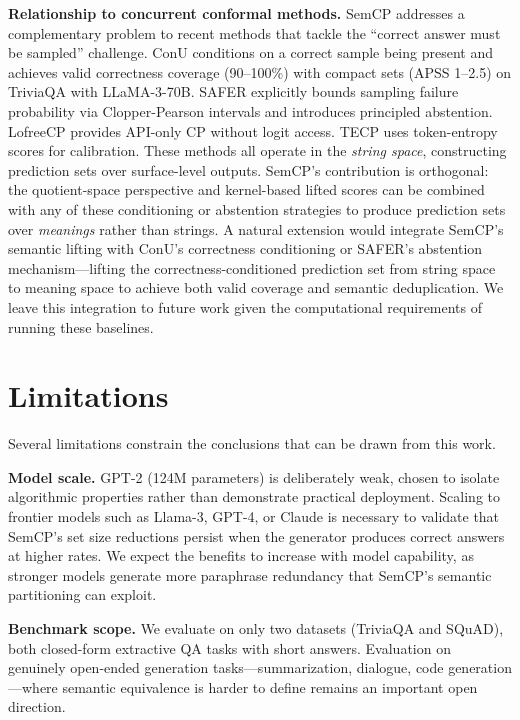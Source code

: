 \documentclass{article}
\begin{document}
\textbf{Relationship to concurrent conformal methods.} SemCP addresses a complementary problem to recent methods that tackle the ``correct answer must be sampled'' challenge. ConU \cite{wang2024conu} conditions on a correct sample being present and achieves valid correctness coverage (90--100\%) with compact sets (APSS 1--2.5) on TriviaQA with LLaMA-3-70B. SAFER \cite{kumar2025safer} explicitly bounds sampling failure probability via Clopper-Pearson intervals and introduces principled abstention. LofreeCP \cite{su2024lofreecp} provides API-only CP without logit access. TECP \cite{huang2025tecp} uses token-entropy scores for calibration. These methods all operate in the \emph{string space}, constructing prediction sets over surface-level outputs. SemCP's contribution is orthogonal: the quotient-space perspective and kernel-based lifted scores can be combined with any of these conditioning or abstention strategies to produce prediction sets over \emph{meanings} rather than strings. A natural extension would integrate SemCP's semantic lifting with ConU's correctness conditioning or SAFER's abstention mechanism---lifting the correctness-conditioned prediction set from string space to meaning space to achieve both valid coverage and semantic deduplication. We leave this integration to future work given the computational requirements of running these baselines.

\section{Limitations}

\label{sec:limitations}

Several limitations constrain the conclusions that can be drawn from this work.

\textbf{Model scale.} GPT-2 (124M parameters) is deliberately weak, chosen to isolate algorithmic properties rather than demonstrate practical deployment. Scaling to frontier models such as Llama-3, GPT-4, or Claude is necessary to validate that SemCP's set size reductions persist when the generator produces correct answers at higher rates. We expect the benefits to increase with model capability, as stronger models generate more paraphrase redundancy that SemCP's semantic partitioning can exploit.

\textbf{Benchmark scope.} We evaluate on only two datasets (TriviaQA and SQuAD), both closed-form extractive QA tasks with short answers. Evaluation on genuinely open-ended generation tasks---summarization, dialogue, code generation---where semantic equivalence is harder to define remains an important open direction.
\end{document}
